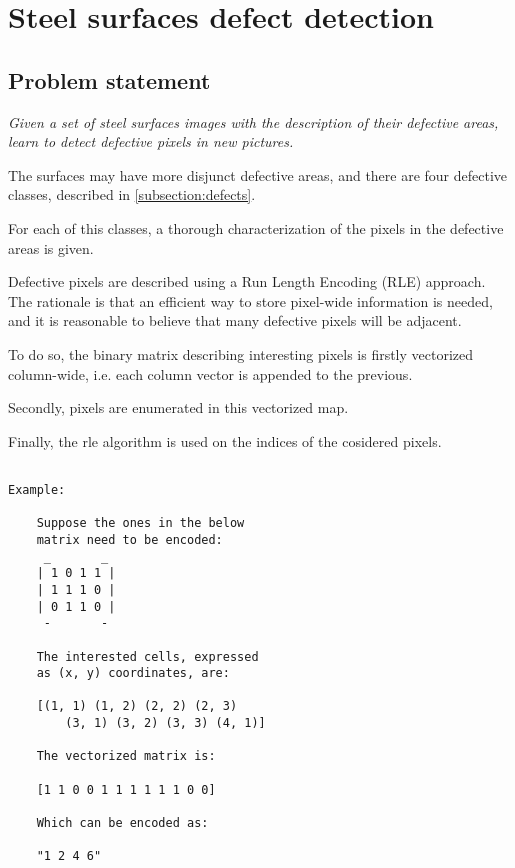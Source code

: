 \section{Steel surfaces defect detection}
    \subsection{Problem statement}
        \par{
            \emph{Given a set of steel surfaces images with the description of their defective areas, learn to detect defective pixels in new pictures.}
        }
        \par{
            The surfaces may have more disjunct defective areas, and there are four defective classes, described in \ref{subsection:defects}.
        }
        \par{
            For each of this classes, a thorough characterization of the pixels in the defective areas is given.
        }
        \par{
            Defective pixels are described using a Run Length Encoding (RLE) approach. The rationale is that an efficient way to store pixel-wide information is needed, and it is reasonable to believe that many defective pixels will be adjacent.
        }
        \par{
            To do so, the binary matrix describing interesting pixels is firstly vectorized column-wide, i.e. each column vector is appended to the previous.
        }
        \par{
            Secondly, pixels are enumerated in this vectorized map.
        }
        \par{
            Finally, the rle algorithm is used on the indices of the cosidered pixels.
        }
        \par{
            \begin{BVerbatim}

Example:

    Suppose the ones in the below 
    matrix need to be encoded:
     _       _
    | 1 0 1 1 |
    | 1 1 1 0 |
    | 0 1 1 0 |
     -       -

    The interested cells, expressed 
    as (x, y) coordinates, are:

    [(1, 1) (1, 2) (2, 2) (2, 3)
        (3, 1) (3, 2) (3, 3) (4, 1)]
    
    The vectorized matrix is:

    [1 1 0 0 1 1 1 1 1 1 0 0]

    Which can be encoded as:

    "1 2 4 6"
           
            \end{BVerbatim}
        }
